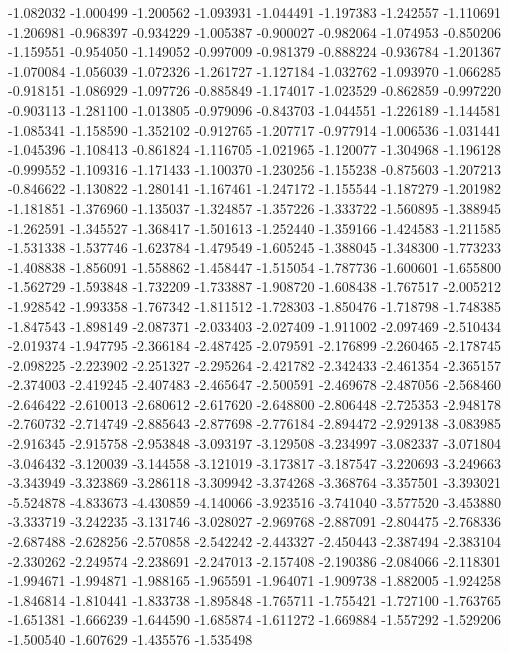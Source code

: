 -1.082032
-1.000499
-1.200562
-1.093931
-1.044491
-1.197383
-1.242557
-1.110691
-1.206981
-0.968397
-0.934229
-1.005387
-0.900027
-0.982064
-1.074953
-0.850206
-1.159551
-0.954050
-1.149052
-0.997009
-0.981379
-0.888224
-0.936784
-1.201367
-1.070084
-1.056039
-1.072326
-1.261727
-1.127184
-1.032762
-1.093970
-1.066285
-0.918151
-1.086929
-1.097726
-0.885849
-1.174017
-1.023529
-0.862859
-0.997220
-0.903113
-1.281100
-1.013805
-0.979096
-0.843703
-1.044551
-1.226189
-1.144581
-1.085341
-1.158590
-1.352102
-0.912765
-1.207717
-0.977914
-1.006536
-1.031441
-1.045396
-1.108413
-0.861824
-1.116705
-1.021965
-1.120077
-1.304968
-1.196128
-0.999552
-1.109316
-1.171433
-1.100370
-1.230256
-1.155238
-0.875603
-1.207213
-0.846622
-1.130822
-1.280141
-1.167461
-1.247172
-1.155544
-1.187279
-1.201982
-1.181851
-1.376960
-1.135037
-1.324857
-1.357226
-1.333722
-1.560895
-1.388945
-1.262591
-1.345527
-1.368417
-1.501613
-1.252440
-1.359166
-1.424583
-1.211585
-1.531338
-1.537746
-1.623784
-1.479549
-1.605245
-1.388045
-1.348300
-1.773233
-1.408838
-1.856091
-1.558862
-1.458447
-1.515054
-1.787736
-1.600601
-1.655800
-1.562729
-1.593848
-1.732209
-1.733887
-1.908720
-1.608438
-1.767517
-2.005212
-1.928542
-1.993358
-1.767342
-1.811512
-1.728303
-1.850476
-1.718798
-1.748385
-1.847543
-1.898149
-2.087371
-2.033403
-2.027409
-1.911002
-2.097469
-2.510434
-2.019374
-1.947795
-2.366184
-2.487425
-2.079591
-2.176899
-2.260465
-2.178745
-2.098225
-2.223902
-2.251327
-2.295264
-2.421782
-2.342433
-2.461354
-2.365157
-2.374003
-2.419245
-2.407483
-2.465647
-2.500591
-2.469678
-2.487056
-2.568460
-2.646422
-2.610013
-2.680612
-2.617620
-2.648800
-2.806448
-2.725353
-2.948178
-2.760732
-2.714749
-2.885643
-2.877698
-2.776184
-2.894472
-2.929138
-3.083985
-2.916345
-2.915758
-2.953848
-3.093197
-3.129508
-3.234997
-3.082337
-3.071804
-3.046432
-3.120039
-3.144558
-3.121019
-3.173817
-3.187547
-3.220693
-3.249663
-3.343949
-3.323869
-3.286118
-3.309942
-3.374268
-3.368764
-3.357501
-3.393021
-5.524878
-4.833673
-4.430859
-4.140066
-3.923516
-3.741040
-3.577520
-3.453880
-3.333719
-3.242235
-3.131746
-3.028027
-2.969768
-2.887091
-2.804475
-2.768336
-2.687488
-2.628256
-2.570858
-2.542242
-2.443327
-2.450443
-2.387494
-2.383104
-2.330262
-2.249574
-2.238691
-2.247013
-2.157408
-2.190386
-2.084066
-2.118301
-1.994671
-1.994871
-1.988165
-1.965591
-1.964071
-1.909738
-1.882005
-1.924258
-1.846814
-1.810441
-1.833738
-1.895848
-1.765711
-1.755421
-1.727100
-1.763765
-1.651381
-1.666239
-1.644590
-1.685874
-1.611272
-1.669884
-1.557292
-1.529206
-1.500540
-1.607629
-1.435576
-1.535498
